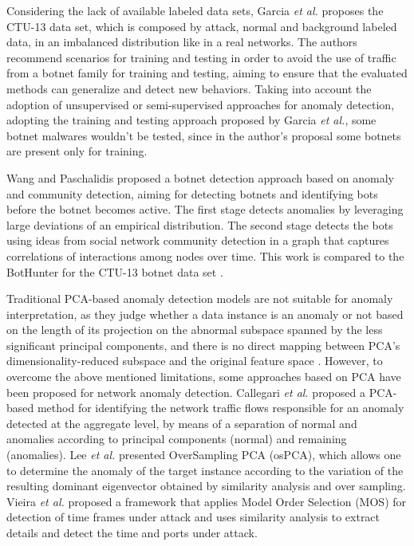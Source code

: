 Considering the lack of available labeled data sets, Garcia \emph{et al.} \cite{garcia2014empirical} proposes the CTU-13 data set, which is composed by attack, normal and background labeled data, in an imbalanced distribution like in a real networks. The authors recommend scenarios for training and testing in order to avoid the use of traffic from a botnet family for training and testing, aiming to ensure that the evaluated methods can generalize and detect new behaviors. Taking into account the adoption of unsupervised or semi-supervised approaches for anomaly detection, adopting the training and testing approach proposed by Garcia \emph{et al.}, some botnet malwares wouldn't be tested, since in the author's proposal some botnets are present only for training.

Wang and Paschalidis \cite{wang2017botnet} proposed a botnet detection approach based on anomaly and community detection, aiming for detecting botnets and identifying bots before the botnet becomes active. The first stage detects anomalies by leveraging large deviations of an empirical distribution. The second stage detects the bots using ideas from social network community detection in a graph that captures correlations of interactions among nodes over time. This work is compared to the BotHunter \cite{gu2007bothunter} for the CTU-13 botnet data set \cite{garcia2014empirical}.

Traditional PCA-based anomaly detection models are not suitable for anomaly interpretation, as they judge whether a data instance is an anomaly or not based on the length of its projection on the abnormal subspace spanned by the less significant principal components, and there is no direct mapping between PCA’s dimensionality-reduced subspace and the original feature space \cite{ringberg2007sensitivity}. However, to overcome the above mentioned limitations, some approaches based on PCA have been proposed for network anomaly detection. Callegari \emph{et al.} \cite{callegari2011novel} proposed a PCA-based method for identifying the network traffic flows responsible for an anomaly detected at the aggregate level, by means of a separation of normal and anomalies according to principal components (normal) and remaining (anomalies). Lee \emph{et al.} \cite{Lee2013} presented OverSampling PCA (osPCA), which allows one to determine the anomaly of the target instance according to the variation of the resulting dominant eigenvector obtained by similarity analysis and over sampling. Vieira \emph{et al.} \cite{vieira2017model} proposed a framework that applies Model Order Selection (MOS) for detection of time frames under attack and uses similarity analysis to extract details and detect the time and ports under attack.

